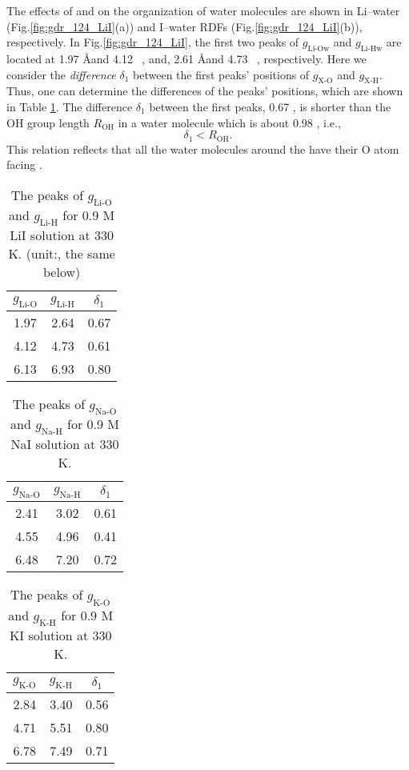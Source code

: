 The effects of \Li and \I on the organization of water molecules are shown in Li--water (Fig.\space\ref{fig:gdr_124_LiI}(a)) 
and I--water RDFs (Fig.\space\ref{fig:gdr_124_LiI}(b)), respectively.  
In Fig.\space\ref{fig:gdr_124_LiI}, the first two peaks of $g_{\text{Li-Ow}}$ and $g_{\text{Li-Hw}}$ are located at 1.97 \AA and 4.12 \ \A,  
and, 2.61 \AA and 4.73 \ \A, respectively. 
Here we consider the \emph{difference} $\delta_1$ between the first peaks' positions of $g_{\text{X-O}}$ and $g_{\text{X-H}}$. 
Thus, one can determine the differences of the peaks' positions, which are shown in Table \ref{tab:gdr_Li-water}. 
The difference $\delta_1$ between the first peaks, 0.67 \A, is shorter than the OH group length $R_{\text{OH}}$ in a water molecule which is about 0.98 \A, i.e.,
\begin{equation}
\delta_1 < R_{\text{OH}}.
\label{lt_OH}
\end{equation}
This relation reflects that all the water molecules around the \Li have their O atom facing \li. 
\begin{table}[htbp]
\centering
\caption{\label{tab:gdr_Li-water} 
The peaks of $g_{\text{Li-O}}$ and $g_{\text{Li-H}}$ for 0.9 M LiI solution at 330 K. (unit:\A, the same below)}
\begin{tabular}{ccc}
  $g_{\text{Li-O}}$& $g_{\text{Li-H}}$ & $\delta_1$  \\
\hline
 1.97 & 2.64 & 0.67 \\
 4.12&4.73  &0.61  \\
 6.13 &6.93 & 0.80 
\end{tabular}
\end{table}
%
\begin{table}[htbp]
  \centering
  \caption{\label{tab:gdr_Na-water} 
  The peaks of $g_{\text{Na-O}}$ and $g_{\text{Na-H}}$ for 0.9 M NaI solution at 330 K.}
  \begin{tabular}{ccc}
    $g_{\text{Na-O}}$& $g_{\text{Na-H}}$ & $\delta_1$  \\
  \hline
   2.41 & 3.02 & 0.61 \\
   4.55 & 4.96  &0.41  \\
   6.48 & 7.20 & 0.72 
  \end{tabular}
\end{table}
%
\begin{table}[htbp]
    \centering
    \caption{\label{tab:gdr_K-water} 
    The peaks of $g_{\text{K-O}}$ and $g_{\text{K-H}}$ for 0.9 M KI solution at 330 K.}
    \begin{tabular}{ccc}
      $g_{\text{K-O}}$& $g_{\text{K-H}}$ & $\delta_1$  \\
    \hline
     2.84 & 3.40 & 0.56 \\
     4.71& 5.51  &0.80 \\
     6.78 & 7.49 & 0.71 
    \end{tabular}
\end{table}
